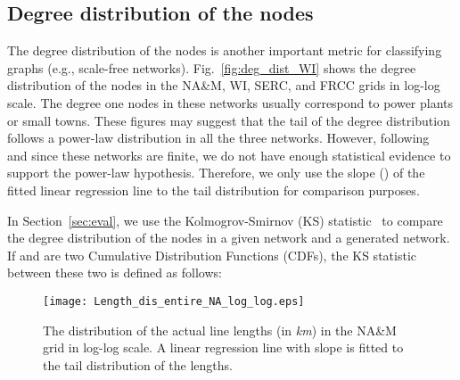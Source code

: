\documentclass[10pt,journal]{IEEEtran}
\begin{document}
\subsection{Degree distribution of the nodes}
The degree distribution of the nodes is another important metric for classifying graphs (e.g., scale-free networks). Fig.~\ref{fig:deg_dist_WI} shows the degree distribution of the nodes in the NA\&M, WI, SERC, and FRCC grids in log-log scale. The degree one nodes in these networks usually correspond to power plants or small towns. These figures may suggest that the tail of the degree distribution follows a power-law distribution in all the three networks. However, following~\cite{clauset2009power} and since these networks are finite, we do not have enough statistical evidence to support the power-law hypothesis. Therefore, we only use the slope () of the fitted linear regression line to the tail distribution for comparison purposes.

In Section~\ref{sec:eval}, we  use the Kolmogrov-Smirnov (KS) statistic~\cite{press2007numerical} to compare the degree distribution of the nodes in a given network and a generated network. If  and  are two Cumulative Distribution Functions (CDFs), the KS statistic between these two is defined as follows:





\begin{figure}[t]
\centering
\vspace*{-0.2cm}
\texttt{[image: Length\_dis\_entire\_NA\_log\_log.eps]}
\vspace*{-0.2cm}
\caption{The distribution of the actual line lengths (in \emph{km}) in the NA\&M grid in log-log scale. A linear regression line with slope  is fitted to the tail distribution of the lengths.}
\label{fig:dist_lines_NA}
\vspace*{0.2cm}
\end{figure}
\end{document}
